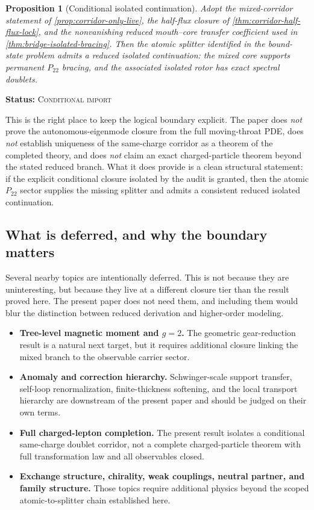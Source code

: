\documentclass[11pt]{article}
\theoremstyle{plain}
\newtheorem{proposition}[theorem]{Proposition}
\theoremstyle{definition}
\theoremstyle{remark}
\newcommand{\statusConditional}{\textsc{Conditional import}}
\newcommand{\claimstatus}[1]{\par\smallskip\noindent\textbf{Status:} #1\par\smallskip}
\newcommand{\Ptwotwo}{P_{22}}
\begin{document}
\begin{proposition}[Conditional isolated continuation]\label{prop:discussion-conditional-continuation}
Adopt the mixed-corridor statement of \cref{prop:corridor-only-live}, the half-flux closure of \cref{thm:corridor-half-flux-lock}, and the nonvanishing reduced mouth--core transfer coefficient used in \cref{thm:bridge-isolated-bracing}. Then the atomic splitter identified in the bound-state problem admits a reduced isolated continuation: the mixed core supports permanent \(\Ptwotwo\) bracing, and the associated isolated rotor has exact spectral doublets.
\end{proposition}
\claimstatus{\statusConditional}

This is the right place to keep the logical boundary explicit. The paper does \emph{not} prove the autonomous-eigenmode closure from the full moving-throat PDE, does \emph{not} establish uniqueness of the same-charge corridor as a theorem of the completed theory, and does \emph{not} claim an exact charged-particle theorem beyond the stated reduced branch. What it does provide is a clean structural statement: if the explicit conditional closure isolated by the audit is granted, then the atomic \(\Ptwotwo\) sector supplies the missing splitter and admits a consistent reduced isolated continuation.

\subsection{What is deferred, and why the boundary matters}\label{subsec:discussion-deferred}

Several nearby topics are intentionally deferred. This is not because they are uninteresting, but because they live at a different closure tier than the result proved here. The present paper does not need them, and including them would blur the distinction between reduced derivation and higher-order modeling.

\begin{itemize}
    \item \textbf{Tree-level magnetic moment and \texorpdfstring{$g=2$}{g=2}.} The geometric gear-reduction result is a natural next target, but it requires additional closure linking the mixed branch to the observable carrier sector.
    \item \textbf{Anomaly and correction hierarchy.} Schwinger-scale support transfer, self-loop renormalization, finite-thickness softening, and the local transport hierarchy are downstream of the present paper and should be judged on their own terms.
    \item \textbf{Full charged-lepton completion.} The present result isolates a conditional same-charge doublet corridor, not a complete charged-particle theorem with full transformation law and all observables closed.
    \item \textbf{Exchange structure, chirality, weak couplings, neutral partner, and family structure.} Those topics require additional physics beyond the scoped atomic-to-splitter chain established here.
\end{itemize}
\end{document}
